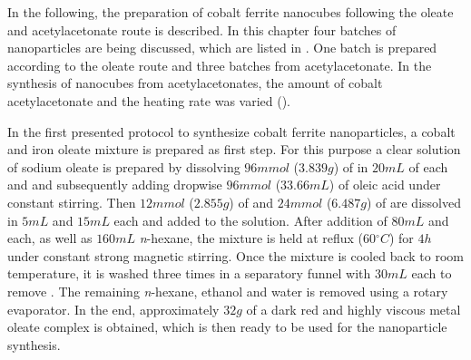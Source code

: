 \documentclass[\main/dresen_thesis.tex]{subfiles}
\begin{document}
  \label{sec:monolayers:nanoparticle:synthesisOleatesAcAc}
  In the following, the preparation of cobalt ferrite nanocubes following the oleate and acetylacetonate route is described.
  In this chapter four batches of nanoparticles are being discussed, which are listed in .
  One batch is prepared according to the oleate route and three batches from acetylacetonate.
  In the synthesis of nanocubes from acetylacetonates, the amount of cobalt acetylacetonate and the heating rate was varied ().

    In the first presented protocol to synthesize cobalt ferrite nanoparticles, a cobalt and iron oleate mixture is prepared as first step.
    For this purpose a clear solution of sodium oleate is prepared by dissolving $96 \unit{mmol}$ ($3.839 \unit{g}$) of  in $20 \unit{mL}$ of each  and  and subsequently adding dropwise $96 \unit{mmol}$ ($33.66 \unit{mL}$) of oleic acid under constant stirring.
    Then $12 \unit{mmol}$ ($2.855 \unit{g}$) of  and $24 \unit{mmol}$ ($6.487 \unit{g}$) of  are dissolved in $5 \unit{mL}$  and $15 \unit{mL}$  each and added to the solution.
    After addition of $80 \unit{mL}$  and  each, as well as $160 \unit{mL}$ \textit{n}-hexane, the mixture is held at reflux ($60 \unit{^\circ C}$) for $4 \unit{h}$ under constant strong magnetic stirring.
    Once the mixture is cooled back to room temperature, it is washed three times in a separatory funnel with $30 \unit{mL}$  each to remove .
    The remaining \textit{n}-hexane, ethanol and water is removed using a rotary evaporator.
    In the end, approximately $32 \unit{g}$ of a dark red and highly viscous metal oleate complex is obtained, which is then ready to be used for the nanoparticle synthesis.
\end{document}
